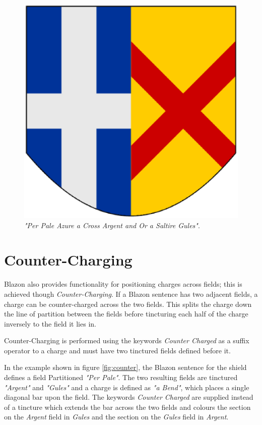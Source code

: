 
\begin{figure}[H]
  \centering
    \includegraphics[width=\textwidth]{Blazon/images/perpaleazureacrossargent.eps}
  \caption{\emph{"Per Pale Azure a Cross Argent and Or a Saltire Gules"}.}
  
\end{figure}

\section{Counter-Charging}

Blazon also provides functionality for positioning charges across fields; this is achieved though \emph{Counter-Charging}.  If a Blazon sentence has two adjacent fields, a charge can be counter-charged across the two fields. This splits the charge down the line of partition between the fields before tincturing each half of the charge inversely to the field it lies in.

Counter-Charging is performed using the keywords \emph{Counter Charged} as a suffix operator to a charge and must have two tinctured fields defined before it. 

In the example shown in figure \ref{fig:counter}, the Blazon sentence for the shield defines a field Partitioned \emph{"Per Pale"}.  The two resulting fields are tinctured \emph{"Argent"} and \emph{"Gules"} and a charge is defined as \emph{"a Bend"}, which places a single diagonal bar upon the field.  The keywords \emph{Counter Charged} are supplied instead of a tincture which extends the bar across the two fields and colours the section on the \emph{Argent} field in \emph{Gules} and the section on the \emph{Gules} field in \emph{Argent}.


